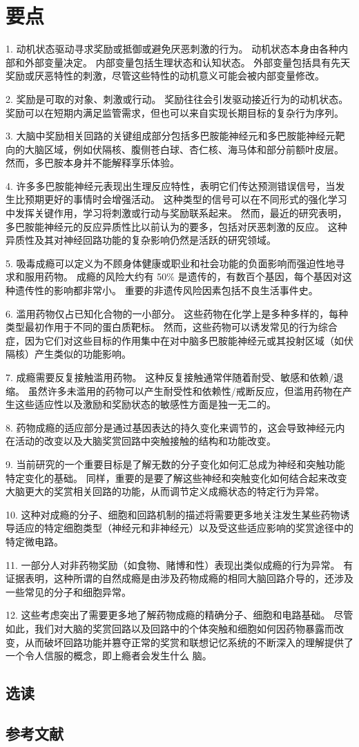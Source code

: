\section{要点}
1. 动机状态驱动寻求奖励或抵御或避免厌恶刺激的行为。 动机状态本身由各种内部和外部变量决定。 内部变量包括生理状态和认知状态。 外部变量包括具有先天奖励或厌恶特性的刺激，尽管这些特性的动机意义可能会被内部变量修改。 

2. 奖励是可取的对象、刺激或行动。 奖励往往会引发驱动接近行为的动机状态。 奖励可以在短期内满足监管需求，但也可以来自实现长期目标的复杂行为序列。 

3. 大脑中奖励相关回路的关键组成部分包括多巴胺能神经元和多巴胺能神经元靶向的大脑区域，例如伏隔核、腹侧苍白球、杏仁核、海马体和部分前额叶皮层。 然而，多巴胺本身并不能解释享乐体验。 

4. 许多多巴胺能神经元表现出生理反应特性，表明它们传达预测错误信号，当发生比预期更好的事情时会增强活动。 这种类型的信号可以在不同形式的强化学习中发挥关键作用，学习将刺激或行动与奖励联系起来。 然而，最近的研究表明，多巴胺能神经元的反应异质性比以前认为的要多，包括对厌恶刺激的反应。 这种异质性及其对神经回路功能的复杂影响仍然是活跃的研究领域。 

5. 吸毒成瘾可以定义为不顾身体健康或职业和社会功能的负面影响而强迫性地寻求和服用药物。 成瘾的风险大约有 50\% 是遗传的，有数百个基因，每个基因对这种遗传性的影响都非常小。 重要的非遗传风险因素包括不良生活事件史。 

6. 滥用药物仅占已知化合物的一小部分。 这些药物在化学上是多种多样的，每种类型最初作用于不同的蛋白质靶标。 然而，这些药物可以诱发常见的行为综合症，因为它们对这些目标的作用集中在对中脑多巴胺能神经元或其投射区域（如伏隔核）产生类似的功能影响。 

7. 成瘾需要反复接触滥用药物。 这种反复接触通常伴随着耐受、敏感和依赖/退缩。 虽然许多未滥用的药物可以产生耐受性和依赖性/戒断反应，但滥用药物在产生这些适应性以及激励和奖励状态的敏感性方面是独一无二的。 

8. 药物成瘾的适应部分是通过基因表达的持久变化来调节的，这会导致神经元内在活动的改变以及大脑奖赏回路中突触接触的结构和功能改变。 

9. 当前研究的一个重要目标是了解无数的分子变化如何汇总成为神经和突触功能特定变化的基础。 同样，重要的是要了解这些神经和突触变化如何结合起来改变大脑更大的奖赏相关回路的功能，从而调节定义成瘾状态的特定行为异常。 

10. 这种对成瘾的分子、细胞和回路机制的描述将需要更多地关注发生某些药物诱导适应的特定细胞类型（神经元和非神经元）以及受这些适应影响的奖赏途径中的特定微电路。

11. 一部分人对非药物奖励（如食物、赌博和性）表现出类似成瘾的行为异常。 有证据表明，这种所谓的自然成瘾是由涉及药物成瘾的相同大脑回路介导的，还涉及一些常见的分子和细胞异常。 

12. 这些考虑突出了需要更多地了解药物成瘾的精确分子、细胞和电路基础。 尽管如此，我们对大脑的奖赏回路以及回路中的个体突触和细胞如何因药物暴露而改变，从而破坏回路功能并篡夺正常的奖赏和联想记忆系统的不断深入的理解提供了一个令人信服的概念，即上瘾者会发生什么 脑。

\subsection{选读}
\subsection{参考文献}